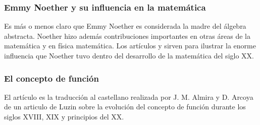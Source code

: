 




% 
\subsubsection*{Emmy Noether y su influencia en la matemática}

Es más o menos claro que Emmy Noether es considerada la madre del álgebra abstracta. 
Noether hizo además contribuciones importantes en otras áreas de la matemática 
y en física matemática. Los artículos 
\cite{zbMATH06696362} y \cite{zbMATH06696361} sirven para 
ilustrar la enorme influencia que Noether tuvo dentro del 
desarrollo de la matemática
del siglo XX. 

\subsubsection*{El concepto de función}

El artículo \cite{zbMATH02353879} es la traducción al castellano 
realizada por J. M. Almira y D. Arcoya de un 
articulo de Luzin sobre la evolución del 
concepto de función durante los siglos XVIII, XIX y principios del XX.



